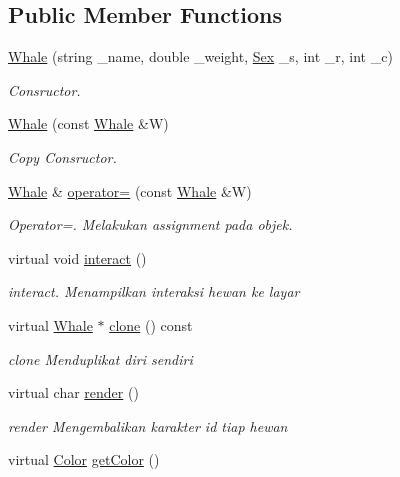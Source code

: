 \subsection*{Public Member Functions}
\begin{DoxyCompactItemize}
\item 
\hyperlink{classWhale_a69b176f8dd6eb515205d8a4a4aa3ff9a}{Whale} (string \+\_\+name, double \+\_\+weight, \hyperlink{sex_8h_a2633cb393c68bb2ee8080db58fb7ba93}{Sex} \+\_\+s, int \+\_\+r, int \+\_\+c)
\begin{DoxyCompactList}\small\item\em Consructor. \end{DoxyCompactList}\item 
\hyperlink{classWhale_a151e8c27f7142d945a16e14bd693077a}{Whale} (const \hyperlink{classWhale}{Whale} \&W)
\begin{DoxyCompactList}\small\item\em Copy Consructor. \end{DoxyCompactList}\item 
\hyperlink{classWhale}{Whale} \& \hyperlink{classWhale_a08dff5d0db8fa709a41e8958c5857eca}{operator=} (const \hyperlink{classWhale}{Whale} \&W)
\begin{DoxyCompactList}\small\item\em Operator=. Melakukan assignment pada objek. \end{DoxyCompactList}\item 
virtual void \hyperlink{classWhale_a4c8a19ea11861b215901cf6e8863f841}{interact} ()
\begin{DoxyCompactList}\small\item\em interact. Menampilkan interaksi hewan ke layar \end{DoxyCompactList}\item 
virtual \hyperlink{classWhale}{Whale} $\ast$ \hyperlink{classWhale_afaae0fbf8fa68bb122a8b977e174991b}{clone} () const 
\begin{DoxyCompactList}\small\item\em clone Menduplikat diri sendiri \end{DoxyCompactList}\item 
virtual char \hyperlink{classWhale_af9e70c8db18076c856da5bbad27c50b7}{render} ()
\begin{DoxyCompactList}\small\item\em render Mengembalikan karakter id tiap hewan \end{DoxyCompactList}\item 
virtual \hyperlink{color_8h_ab87bacfdad76e61b9412d7124be44c1c}{Color} \hyperlink{classWhale_a0cc555d9f7a0d8792ddabd38f58ec43e}{get\+Color} ()

\end{DoxyCompactItemize}
